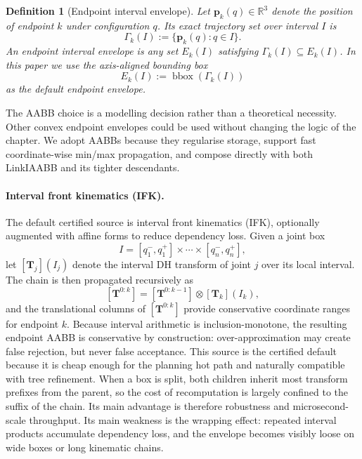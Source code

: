 \documentclass[journal]{IEEEtran}
\newtheorem{definition}{Definition}
\newcommand{\Real}{\ensuremath{\mathbb{R}}}
\begin{document}
\begin{definition}[Endpoint interval envelope]\label{def:endpoint_env}
Let $\bm{p}_k(q) \in \Real^3$ denote the position of endpoint $k$ under
configuration $q$. Its exact trajectory set over interval $I$ is
\[
\Gamma_k(I) := \{\bm{p}_k(q) : q\in I\}.
\]
An endpoint interval envelope is any set $E_k(I)$ satisfying
$\Gamma_k(I) \subseteq E_k(I)$. In this paper we use the axis-aligned bounding
box
\[
E_k(I) := \operatorname{bbox}(\Gamma_k(I))
\]
as the default endpoint envelope.
\end{definition}

The AABB choice is a modelling decision rather than a theoretical necessity.
Other convex endpoint envelopes could be used without changing the logic of the
chapter. We adopt AABBs because they regularise storage, support fast
coordinate-wise min/max propagation, and compose directly with both LinkIAABB
and its tighter descendants.

\paragraph{Interval front kinematics (IFK).}
The default certified source is interval front kinematics (IFK), optionally
augmented with affine forms to reduce dependency loss. Given a joint box
\[
I = [q_1^-,q_1^+] \times \cdots \times [q_n^-,q_n^+],
\]
let $[\bm{T}_j](I_j)$ denote the interval DH transform of joint $j$ over its
local interval. The chain is then propagated recursively as
\[
[\bm{T}^{0:k}] = [\bm{T}^{0:k-1}] \otimes [\bm{T}_k](I_k),
\]
and the translational columns of $[\bm{T}^{0:k}]$ provide conservative
coordinate ranges for endpoint $k$. Because interval arithmetic is
inclusion-monotone, the resulting endpoint AABB is conservative by
construction: over-approximation may create false rejection, but never false
acceptance. This source is the certified default because it is cheap enough for
the planning hot path and naturally compatible with tree refinement. When a box
is split, both children inherit most transform prefixes from the parent, so the
cost of recomputation is largely confined to the suffix of the chain. Its main
advantage is therefore robustness and microsecond-scale throughput. Its main
weakness is the wrapping effect: repeated interval products accumulate
dependency loss, and the envelope becomes visibly loose on wide boxes or long
kinematic chains.
\end{document}
